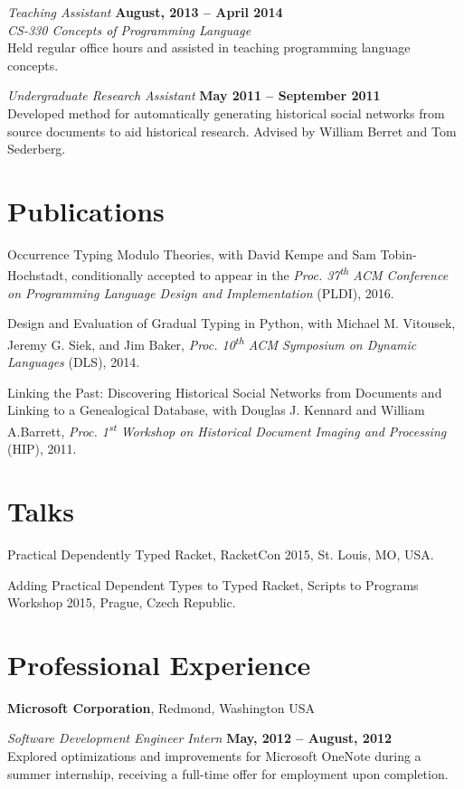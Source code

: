 \documentclass[margin,line]{res}
\newcommand{\ts}{\textsuperscript}
\begin{document}
\begin{resume}
{\em Teaching Assistant} \hfill {\bf August, 2013 -- April 2014}\\
{\em CS-330  Concepts of Programming Language}\\
Held regular office hours and assisted in teaching programming
language concepts.


{\em Undergraduate Research Assistant} \hfill {\bf May 2011 --
  September 2011}\\
Developed method for automatically generating historical social
networks from source documents to aid historical research. Advised by
William Berret and Tom Sederberg.


\section{\sc Publications}

Occurrence Typing Modulo Theories, with David Kempe and Sam
Tobin-Hochstadt, conditionally accepted to appear in the {\em Proc.
  37\ts{th} ACM Conference on Programming Language Design and
  Implementation} (PLDI), 2016.

Design and Evaluation of Gradual Typing in Python, with Michael
M. Vitousek, Jeremy G. Siek, and Jim Baker, {\em Proc.  10\ts{th} ACM
  Symposium on Dynamic Languages} (DLS), 2014.

Linking the Past: Discovering Historical Social Networks from
Documents and Linking to a Genealogical Database, with Douglas
J. Kennard and William A.Barrett, {\em Proc. 1\ts{st} Workshop on
  Historical Document Imaging and Processing} (HIP), 2011.

\section{\sc Talks}
Practical Dependently Typed Racket, RacketCon 2015, St. Louis, MO, USA.

Adding Practical Dependent Types to Typed Racket, Scripts to Programs Workshop 2015, Prague, Czech Republic.

\section{\sc Professional Experience}
{\bf Microsoft Corporation}, Redmond, Washington USA

\vspace{-.3cm}
{\em Software Development Engineer Intern} \hfill {\bf May, 2012 -- August, 2012}\\
Explored optimizations and improvements for Microsoft OneNote during a
summer internship, receiving a full-time offer for employment upon completion.


\end{resume}
\end{document}
